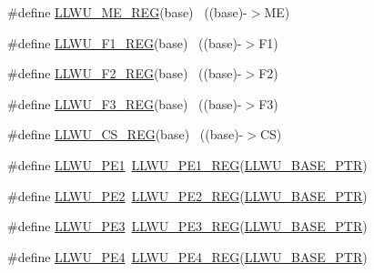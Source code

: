 \begin{DoxyCompactItemize}
\item 
\#define \hyperlink{group___l_l_w_u___register___accessor___macros_gad2163c47741ae9561ed0cf28003dc06d}{L\+L\+W\+U\+\_\+\+M\+E\+\_\+\+R\+EG}(base)                                            ~((base)-\/$>$ME)
\item 
\#define \hyperlink{group___l_l_w_u___register___accessor___macros_ga3f4c680add377053731e36faf88c85c2}{L\+L\+W\+U\+\_\+\+F1\+\_\+\+R\+EG}(base)                                            ~((base)-\/$>$F1)
\item 
\#define \hyperlink{group___l_l_w_u___register___accessor___macros_ga9824713b71d34e05dd1783c6e0153a3c}{L\+L\+W\+U\+\_\+\+F2\+\_\+\+R\+EG}(base)                                            ~((base)-\/$>$F2)
\item 
\#define \hyperlink{group___l_l_w_u___register___accessor___macros_ga8369b30780db4c76aa70c8adf1a763fa}{L\+L\+W\+U\+\_\+\+F3\+\_\+\+R\+EG}(base)                                            ~((base)-\/$>$F3)
\item 
\#define \hyperlink{group___l_l_w_u___register___accessor___macros_ga4c0d49cd090e1c221d332b1f1d2dcade}{L\+L\+W\+U\+\_\+\+C\+S\+\_\+\+R\+EG}(base)                                            ~((base)-\/$>$CS)
\item 
\#define \hyperlink{group___l_l_w_u___register___accessor___macros_gaef03e73b53506377462ca326729d4ff7}{L\+L\+W\+U\+\_\+\+P\+E1}~\hyperlink{group___l_l_w_u___register___accessor___macros_gada86612bb2a3cb6d479429beaca258a8}{L\+L\+W\+U\+\_\+\+P\+E1\+\_\+\+R\+EG}(\hyperlink{group___l_l_w_u___peripheral_ga89c97b9e8756088cb3d8617c022ae6ac}{L\+L\+W\+U\+\_\+\+B\+A\+S\+E\+\_\+\+P\+TR})
\item 
\#define \hyperlink{group___l_l_w_u___register___accessor___macros_ga870481fe118dd8de33a1f8e85120a11c}{L\+L\+W\+U\+\_\+\+P\+E2}~\hyperlink{group___l_l_w_u___register___accessor___macros_ga13e23bebded99c5538c165fec2ffa41f}{L\+L\+W\+U\+\_\+\+P\+E2\+\_\+\+R\+EG}(\hyperlink{group___l_l_w_u___peripheral_ga89c97b9e8756088cb3d8617c022ae6ac}{L\+L\+W\+U\+\_\+\+B\+A\+S\+E\+\_\+\+P\+TR})
\item 
\#define \hyperlink{group___l_l_w_u___register___accessor___macros_gaac6d06ddf8f05c05fb16b45e44696829}{L\+L\+W\+U\+\_\+\+P\+E3}~\hyperlink{group___l_l_w_u___register___accessor___macros_ga0b72bd64b08303c30d4de21aa8bb06b8}{L\+L\+W\+U\+\_\+\+P\+E3\+\_\+\+R\+EG}(\hyperlink{group___l_l_w_u___peripheral_ga89c97b9e8756088cb3d8617c022ae6ac}{L\+L\+W\+U\+\_\+\+B\+A\+S\+E\+\_\+\+P\+TR})
\item 
\#define \hyperlink{group___l_l_w_u___register___accessor___macros_gada12ddd62f9a667b60702dfd8b4f69ff}{L\+L\+W\+U\+\_\+\+P\+E4}~\hyperlink{group___l_l_w_u___register___accessor___macros_gaff14d2acccbae996be61c4ba7893024f}{L\+L\+W\+U\+\_\+\+P\+E4\+\_\+\+R\+EG}(\hyperlink{group___l_l_w_u___peripheral_ga89c97b9e8756088cb3d8617c022ae6ac}{L\+L\+W\+U\+\_\+\+B\+A\+S\+E\+\_\+\+P\+TR})

\end{DoxyCompactItemize}
